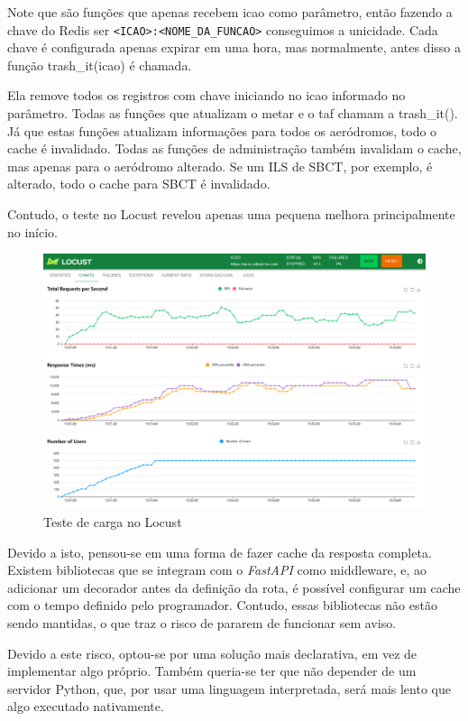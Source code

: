 Note que são funções que apenas recebem icao como parâmetro, então fazendo a chave
do Redis ser \verb|<ICAO>:<NOME_DA_FUNCAO>| conseguimos a unicidade. Cada chave é 
configurada apenas expirar em uma hora, mas normalmente, antes disso a função
trash\_it(icao) é chamada.

Ela remove todos os registros com chave iniciando no
icao informado no parâmetro. Todas as funções que atualizam o metar e o taf chamam
a trash\_it(). Já que estas funções atualizam informações para todos os aeródromos,
todo o cache é invalidado. Todas as funções de administração também invalidam o cache,
mas apenas para 
o aeródromo alterado. Se um ILS de SBCT, por exemplo, é alterado, todo o cache
para SBCT é invalidado.

Contudo, o teste no Locust revelou apenas uma pequena melhora principalmente no
início.

\begin{figure}[ht]
    \begin{center}
    \includegraphics[width=400pt]{img/locust-cache-redis.png}
    \caption{Teste de carga no Locust}
    \label{fig:locust-no-cache}
    \end{center}
\end{figure}

Devido a isto, 
pensou-se em uma forma de fazer cache da resposta completa. Existem bibliotecas que 
se integram com o \textit{FastAPI} como middleware, e, ao adicionar um decorador antes da
definição da rota, é possível configurar um cache com o tempo definido pelo 
programador. Contudo, essas bibliotecas não estão sendo mantidas, o que traz o 
risco de pararem de funcionar sem aviso.

Devido a este risco, optou-se por uma solução mais declarativa, em vez de implementar
algo próprio. Também queria-se ter que não depender de um servidor Python, que, por
usar uma linguagem interpretada, será mais lento que algo executado nativamente.

